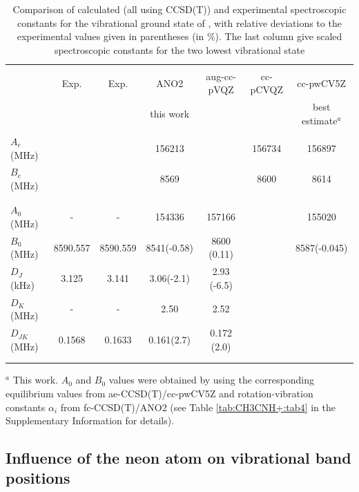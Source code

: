 \begin{table}

\caption{Comparison of calculated (all using CCSD(T)) and experimental spectroscopic constants for the vibrational ground state of \texorpdfstring{\pan}{Ne-CH3CNH+}, with relative deviations to the experimental values \cite{GAM2000} given in parentheses (in \texorpdfstring{$\%$}{}). The last column give scaled spectroscopic constants for the two lowest vibrational state}\label{tbl2}
    \centering
    \scriptsize
    \begin{tabular}{lcccccc}
    \\\hline \hline\\
          & Exp.  & Exp.  & ANO2 & aug-cc-pVQZ & cc-pCVQZ & cc-pwCV5Z  \\
         &  \cite{GAM2000}& \cite{AHH2006}& this work &  \cite{Cerqueira2020} &  \cite{Botschwina2000}& best estimate$^a$ \\
         \hline\\
         $A_e$ (MHz) &  &  & 156213 &  & 156734  & 156897 \\
         $B_e$ (MHz) &  &  & 8569 &  & 8600 & 8614  \\
        \\\hline\\
         $A_0$ (MHz) & - & - & 154336 & 157166& & 155020  \\
        $B_0$ (MHz) & 8590.557 & 8590.559& 8541(-0.58) & 8600 (0.11)& & 8587(-0.045)  \\
         $D_J$ (kHz)  & 3.125 & 3.141 & 3.06(-2.1)&  2.93 (-6.5) & &  \\
         $D_K$ (MHz)  & - & - &  2.50 & 2.52 & & \\
         $D_{JK}$ (MHz) &  0.1568 & 0.1633 & 0.161(2.7) & 0.172 (2.0) & &    \\
         \\\hline \hline\\
    \end{tabular}

$^a$ This work. $A_0$ and $B_0$ values were obtained by using the corresponding equilibrium values from ae-CCSD(T)/cc-pwCV5Z and rotation-vibration constants $\alpha_i$ from fc-CCSD(T)/ANO2 (see Table \ref{tab:CH3CNH+:tab4} in the Supplementary Information for details).

\end{table}
\normalsize


\subsection{Influence of the neon atom on vibrational band positions}
\label{Neon influence}

